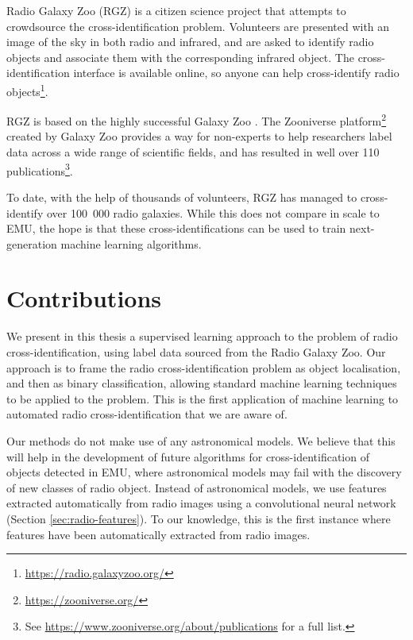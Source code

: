 Radio Galaxy Zoo (RGZ) \citep{banfield15} is a citizen science project that
attempts to crowdsource the cross-identification problem. Volunteers are
presented with an image of the sky in both radio and infrared, and are asked to
identify radio objects and associate them with the corresponding infrared
object. The cross-identification interface is available online, so anyone can
help cross-identify radio objects\footnote{\url{https://radio.galaxyzoo.org/}}.

RGZ is based on the highly successful Galaxy Zoo \citep{lintott08, lintott11}.
The Zooniverse platform\footnote{\url{https://zooniverse.org/}} created by
Galaxy Zoo provides a way for non-experts to help researchers label data across
a wide range of scientific fields, and has resulted in well over 110
publications\footnote{See \url{https://www.zooniverse.org/about/publications}
for a full list.}.

To date, with the help of thousands of volunteers, RGZ has managed to
cross-identify over 100~000 radio galaxies. While this does not compare in scale
to EMU, the hope is that these cross-identifications can be used to train
next-generation machine learning algorithms.

\section{Contributions}
\label{sec:contributions}

  We present in this thesis a supervised learning approach to the problem of
  radio cross-identification, using label data sourced from the Radio Galaxy
  Zoo. Our approach is to frame the radio cross-identification problem as object
  localisation, and then as binary classification, allowing standard machine
  learning techniques to be applied to the problem. This is the first
  application of machine learning to automated radio cross-identification that
  we are aware of.

  Our methods do not make use of any astronomical models. We believe that this
  will help in the development of future algorithms for cross-identification of
  objects detected in EMU, where astronomical models may fail with the discovery
  of new classes of radio object. Instead of astronomical models, we use
  features extracted automatically from radio images using a convolutional
  neural network (Section \ref{sec:radio-features}). To our knowledge, this is
  the first instance where features have been automatically extracted from radio
  images.

